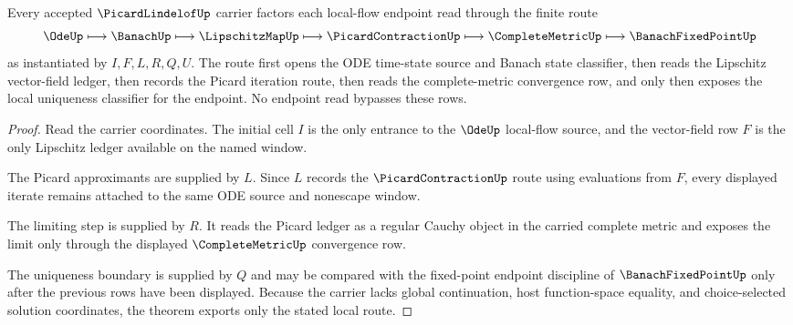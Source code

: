 \begin{theorem}
\label{thm:picard-lindelof-picard-iteration-route}
Every accepted $\PicardLindelofUp$ carrier factors each local-flow endpoint read through the finite route
$$
\OdeUp \longmapsto \BanachUp \longmapsto \LipschitzMapUp \longmapsto \PicardContractionUp \longmapsto \CompleteMetricUp \longmapsto \BanachFixedPointUp
$$
as instantiated by $I,F,L,R,Q,U$. The route first opens the ODE time-state source and Banach state classifier, then reads the Lipschitz vector-field ledger, then records the Picard iteration route, then reads the complete-metric convergence row, and only then exposes the local uniqueness classifier for the endpoint. No endpoint read bypasses these rows.
\end{theorem}
\begin{proof}
Read the carrier coordinates. The initial cell $I$ is the only entrance to the $\OdeUp$ local-flow source, and the vector-field row $F$ is the only Lipschitz ledger available on the named window.

The Picard approximants are supplied by $L$. Since $L$ records the $\PicardContractionUp$ route using evaluations from $F$, every displayed iterate remains attached to the same ODE source and nonescape window.

The limiting step is supplied by $R$. It reads the Picard ledger as a regular Cauchy object in the carried complete metric and exposes the limit only through the displayed $\CompleteMetricUp$ convergence row.

The uniqueness boundary is supplied by $Q$ and may be compared with the fixed-point endpoint discipline of $\BanachFixedPointUp$ only after the previous rows have been displayed. Because the carrier lacks global continuation, host function-space equality, and choice-selected solution coordinates, the theorem exports only the stated local route.
\end{proof}

